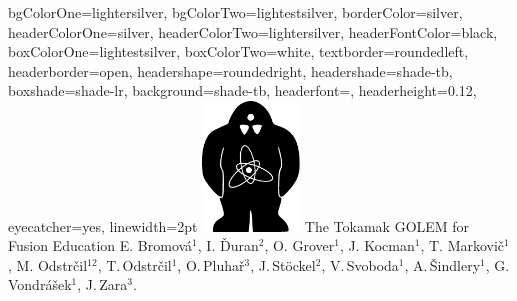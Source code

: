 \documentclass[portrait,final,a0paper]{baposter}
\begin{document}
\begin{poster}
{  %
  bgColorOne=lightersilver,  %
  bgColorTwo=lightestsilver,
  borderColor=silver,		%
  headerColorOne=silver,	%
  headerColorTwo=lightersilver,
  headerFontColor=black,
  boxColorOne=lightestsilver,
  boxColorTwo=white,
  textborder=roundedleft,  %
  headerborder=open,%
  headershape=roundedright,
  headershade=shade-tb, %
  boxshade=shade-lr,
  background=shade-tb,
  headerfont=\Large\textsf, %
  headerheight=0.12\textheight,%
  eyecatcher=yes,
  linewidth=2pt
  }
  {\includegraphics[width=7em]{golem.pdf}} %
  {%
  \sc\huge    The Tokamak GOLEM for Fusion Education \vspace{ 0.2cm}}
  {%
  E. Bromov\'a$^1$, I. \v Duran$^2$, O. Grover$^1$, J. Kocman$^1$, T. Markovi\v{c}$^1$, M. Odstr\v cil$^{12}$, T.\,Odstr\v cil$^1$\!, O.\,Pluha\v r$^3$\!, J.\,St\" ockel$^2$\!, V.\,Svoboda$^1$\!, A.\,\v Sindlery$^1$\!, G.\,Vondr\'a\v sek$^1$\!, J.\,Zara$^3$\!.\\
}
\end{poster}
\end{document}

